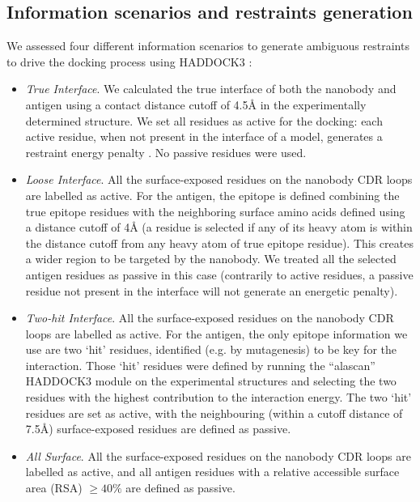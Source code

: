 \documentclass[12pt]{article}
\begin{document}
\subsection{Information scenarios and restraints generation}

We assessed four different information scenarios to generate ambiguous restraints to drive the docking process using HADDOCK3 \cite{giulini2025haddock3}:

\begin{itemize}
    
\item \textit{True Interface}. We calculated the true interface of both the nanobody and antigen using a contact distance cutoff of 4.5Å in the experimentally determined structure. We set all residues as active for the docking: each active residue, when not present in the interface of a model, generates a restraint energy penalty \cite{dominguez2003haddock}. No passive residues were used.
\item \textit{Loose Interface}. All the surface-exposed residues on the nanobody CDR loops are labelled as active. For the antigen, the epitope is defined combining the true epitope residues with the neighboring surface amino acids defined using a distance cutoff of 4Å (a residue is selected if any of its heavy atom is within the distance cutoff from any heavy atom of true epitope residue). This creates a wider region to be targeted by the nanobody. We treated all the selected antigen residues as passive in this case (contrarily to active residues, a passive residue not present in the interface will not generate an energetic penalty).
\item \textit{Two-hit Interface}. All the surface-exposed residues on the nanobody CDR loops are labelled as active. For the antigen, the only epitope information we use are two ‘hit’ residues, identified (e.g. by mutagenesis) to be key for the interaction. Those ‘hit’ residues were defined by running the “alascan” HADDOCK3 module on the experimental structures and selecting the two residues with the highest contribution to the interaction energy. The two ‘hit’ residues are set as active, with the neighbouring (within a cutoff distance of 7.5Å) surface-exposed residues are defined as passive.

\item \textit{All Surface}. All the surface-exposed residues on the nanobody CDR loops are labelled as active, and all antigen residues with a relative accessible surface area (RSA) $\geq 40\%$ are defined as passive.

\end{itemize}
\end{document}
